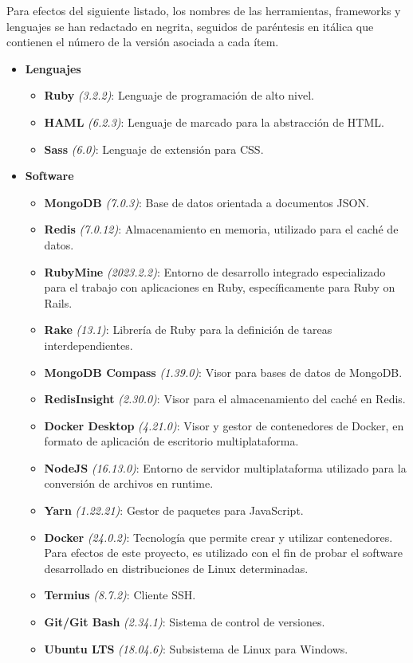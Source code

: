 Para efectos del siguiente listado, los nombres de las herramientas, frameworks y lenguajes se han redactado en negrita, seguidos de paréntesis en itálica que contienen el número de la versión asociada a cada ítem.

\begin{itemize}
	\item[] \textbf{Lenguajes}
	\begin{itemize}
		\item \textbf{Ruby} \textit{(3.2.2)}: Lenguaje de programación de alto nivel.
		\item \textbf{HAML} \textit{(6.2.3)}: Lenguaje de marcado para la abstracción de HTML.
		\item \textbf{Sass} \textit{(6.0)}: Lenguaje de extensión para CSS.
	\end{itemize}
\end{itemize}

\begin{itemize}
	\item[] \textbf{Software}
	\begin{itemize}
		\item \textbf{MongoDB} \textit{(7.0.3)}: Base de datos orientada a documentos JSON.
		\item \textbf{Redis} \textit{(7.0.12)}: Almacenamiento en memoria, utilizado para el caché de datos.
		\item \textbf{RubyMine} \textit{(2023.2.2)}: Entorno de desarrollo integrado especializado para el trabajo con aplicaciones en Ruby, específicamente para Ruby on Rails.
		\item \textbf{Rake} \textit{(13.1)}: Librería de Ruby para la definición de tareas interdependientes.
		\item \textbf{MongoDB Compass} \textit{(1.39.0)}: Visor para bases de datos de MongoDB.
		\item \textbf{RedisInsight} \textit{(2.30.0)}: Visor para el almacenamiento del caché en Redis.
		\item \textbf{Docker Desktop} \textit{(4.21.0)}: Visor y gestor de contenedores de Docker, en formato de aplicación de escritorio multiplataforma.
		\item \textbf{NodeJS} \textit{(16.13.0)}: Entorno de servidor multiplataforma utilizado para la conversión de archivos en runtime.
		\item \textbf{Yarn} \textit{(1.22.21)}: Gestor de paquetes para JavaScript.
		\item \textbf{Docker} \textit{(24.0.2)}: Tecnología que permite crear y utilizar contenedores. Para efectos de este proyecto, es utilizado con el fin de probar el software desarrollado en distribuciones de Linux determinadas.
		\item \textbf{Termius} \textit{(8.7.2)}: Cliente SSH.
		\item \textbf{Git/Git Bash} \textit{(2.34.1)}: Sistema de control de versiones.
		\item \textbf{Ubuntu LTS} \textit{(18.04.6)}: Subsistema de Linux para Windows.
	\end{itemize}
\end{itemize}

